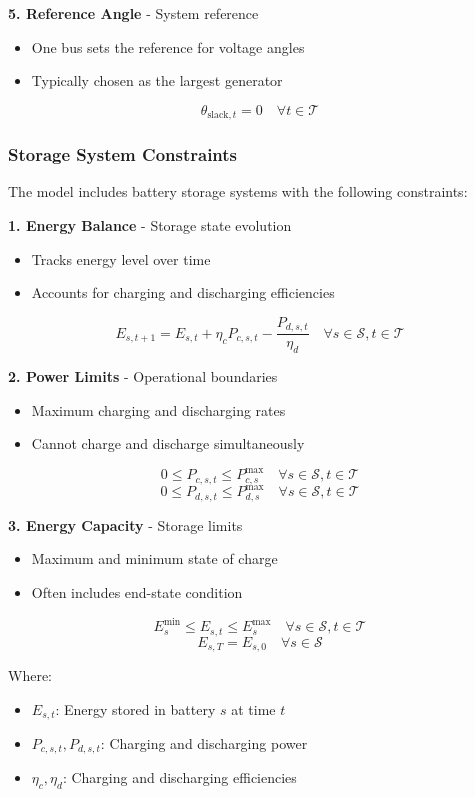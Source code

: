 \vspace{0.5cm}
\textbf{5. Reference Angle} - System reference
\begin{itemize}
    \item One bus sets the reference for voltage angles
    \item Typically chosen as the largest generator
\end{itemize}
\begin{equation}
    \theta_{\text{slack},t} = 0 \quad \forall t \in \mathcal{T}
\end{equation}

\subsubsection{Storage System Constraints}
The model includes battery storage systems with the following constraints:

\vspace{0.5cm}
\textbf{1. Energy Balance} - Storage state evolution
\begin{itemize}
    \item Tracks energy level over time
    \item Accounts for charging and discharging efficiencies
\end{itemize}
\begin{equation}
    E_{s,t+1} = E_{s,t} + \eta_c P_{c,s,t} - \frac{P_{d,s,t}}{\eta_d} \quad \forall s \in \mathcal{S}, t \in \mathcal{T}
\end{equation}

\vspace{0.5cm}
\textbf{2. Power Limits} - Operational boundaries
\begin{itemize}
    \item Maximum charging and discharging rates
    \item Cannot charge and discharge simultaneously
\end{itemize}
\begin{equation}
    0 \leq P_{c,s,t} \leq P_{c,s}^{\max} \quad \forall s \in \mathcal{S}, t \in \mathcal{T}
\end{equation}
\begin{equation}
    0 \leq P_{d,s,t} \leq P_{d,s}^{\max} \quad \forall s \in \mathcal{S}, t \in \mathcal{T}
\end{equation}

\vspace{0.5cm}
\textbf{3. Energy Capacity} - Storage limits
\begin{itemize}
    \item Maximum and minimum state of charge
    \item Often includes end-state condition
\end{itemize}
\begin{equation}
    E_{s}^{\min} \leq E_{s,t} \leq E_{s}^{\max} \quad \forall s \in \mathcal{S}, t \in \mathcal{T}
\end{equation}
\begin{equation}
    E_{s,T} = E_{s,0} \quad \forall s \in \mathcal{S}
\end{equation}

Where:
\begin{itemize}
    \item $E_{s,t}$: Energy stored in battery $s$ at time $t$
    \item $P_{c,s,t}, P_{d,s,t}$: Charging and discharging power
    \item $\eta_c, \eta_d$: Charging and discharging efficiencies
\end{itemize}

